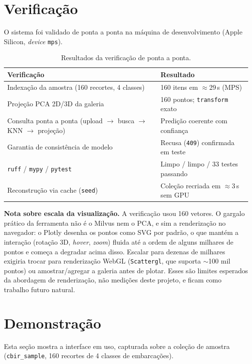 \documentclass[10pt]{article}
\begin{document}
\section{Verificação}

O sistema foi validado de ponta a ponta na máquina de desenvolvimento
(Apple Silicon, \emph{device} \texttt{mps}).

\begin{table}[H]
\centering
\begin{tabular}{@{}p{8.5cm}p{5.5cm}@{}}
\toprule
\textbf{Verificação} & \textbf{Resultado} \\
\midrule
Indexação da amostra (160 recortes, 4 classes) & 160 itens em $\approx$29\,s (MPS) \\
Projeção PCA 2D/3D da galeria & 160 pontos; \texttt{transform} exato \\
Consulta ponta a ponta (upload $\rightarrow$ busca $\rightarrow$ KNN $\rightarrow$ projeção) & Predição coerente com confiança \\
Garantia de consistência de modelo & Recusa (\texttt{409}) confirmada em teste \\
\texttt{ruff} / \texttt{mypy} / \texttt{pytest} & Limpo / limpo / 33 testes passando \\
Reconstrução via cache (\texttt{seed}) & Coleção recriada em $\approx$3\,s sem GPU \\
\bottomrule
\end{tabular}
\caption{Resultados da verificação de ponta a ponta.}
\end{table}

\medskip
\noindent\textbf{Nota sobre escala da visualização.} A verificação usou 160
vetores. O gargalo prático da ferramenta não é o Milvus nem o PCA, e sim a
renderização no navegador: o Plotly desenha os pontos como SVG por padrão, o que
mantém a interação (rotação 3D, \emph{hover}, \emph{zoom}) fluida até a ordem de
alguns milhares de pontos e começa a degradar acima disso. Escalar para dezenas
de milhares exigiria trocar para renderização WebGL (\texttt{Scattergl}, que
suporta $\sim$100 mil pontos) ou amostrar/agregar a galeria antes de plotar.
Esses são limites esperados da abordagem de renderização, não medições deste
projeto, e ficam como trabalho futuro natural.

\section{Demonstração}

Esta seção mostra a interface em uso, capturada sobre a coleção de amostra
(\texttt{cbir\_sample}, 160 recortes de 4 classes de embarcações).
\end{document}
